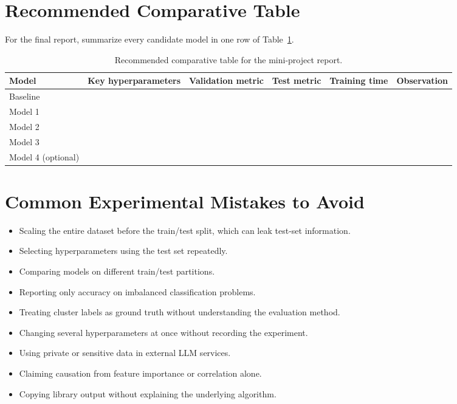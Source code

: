 \section{Recommended Comparative Table}
For the final report, summarize every candidate model in one row of
Table~\ref{tab:mini-comparative}.

\begin{table}[htbp]
  \centering
  \caption{Recommended comparative table for the mini-project report.}
  \label{tab:mini-comparative}
  \renewcommand{\arraystretch}{1.8}
  \begin{tabular}{|p{}|p{}|p{}|p{}|p{}|p{}|}
    \hline
\rowcolor{mlblue!8}    \textbf{Model} & \textbf{Key hyperparameters} & \textbf{Validation metric} & \textbf{Test metric} & \textbf{Training time} & \textbf{Observation} \\
    \hline
    Baseline &  &  &  &  &  \\
\hline
    Model 1 &  &  &  &  &  \\
\hline
    Model 2 &  &  &  &  &  \\
\hline
    Model 3 &  &  &  &  &  \\
\hline
    Model 4 (optional) &  &  &  &  &  \\
    \hline
  \end{tabular}
\end{table}

\section{Common Experimental Mistakes to Avoid}
\begin{itemize}
  \item Scaling the entire dataset before the train/test split, which can leak test-set information.
  \item Selecting hyperparameters using the test set repeatedly.
  \item Comparing models on different train/test partitions.
  \item Reporting only accuracy on imbalanced classification problems.
  \item Treating cluster labels as ground truth without understanding the evaluation method.
  \item Changing several hyperparameters at once without recording the experiment.
  \item Using private or sensitive data in external LLM services.
  \item Claiming causation from feature importance or correlation alone.
  \item Copying library output without explaining the underlying algorithm.
\end{itemize}

